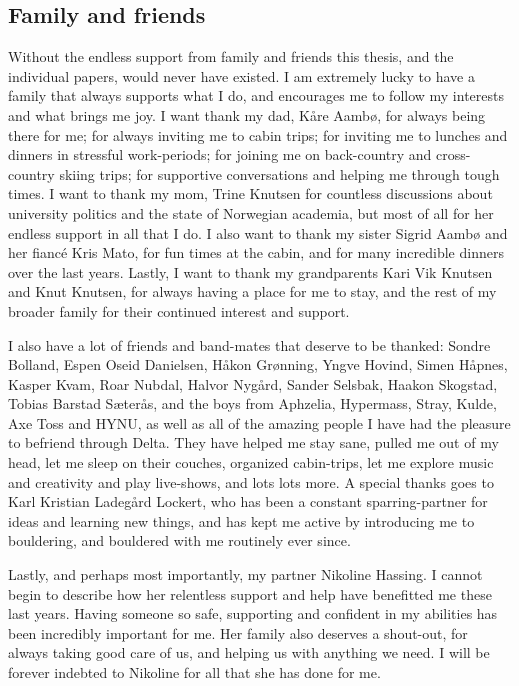 \subsection*{Family and friends}

Without the endless support from family and friends this thesis, and the individual papers, would never have existed. I am extremely lucky to have a family that always supports what I do, and encourages me to follow my interests and what brings me joy. I want thank my dad, Kåre Aambø, for always being there for me; for always inviting me to cabin trips; for inviting me to lunches and dinners in stressful work-periods; for joining me on back-country and cross-country skiing trips; for supportive conversations and helping me through tough times. I want to thank my mom, Trine Knutsen for countless discussions about university politics and the state of Norwegian academia, but most of all for her endless support in all that I do. I also want to thank my sister Sigrid Aambø and her fiancé Kris Mato, for fun times at the cabin, and for many incredible dinners over the last years. Lastly, I want to thank my grandparents Kari Vik Knutsen and Knut Knutsen, for always having a place for me to stay, and the rest of my broader family for their continued interest and support. 

I also have a lot of friends and band-mates that deserve to be thanked: 
Sondre Bolland, 
Espen Oseid Danielsen, 
Håkon Grønning, 
Yngve Hovind, 
Simen Håpnes, 
Kasper Kvam, 
Roar Nubdal, 
Halvor Nygård, 
Sander Selsbak, 
Haakon Skogstad, 
Tobias Barstad Sæterås, 
and the boys from Aphzelia, Hypermass, Stray, Kulde, Axe Toss and HYNU, as well as all of the amazing people I have had the pleasure to befriend through Delta. They have helped me stay sane, pulled me out of my head, let me sleep on their couches, organized cabin-trips, let me explore music and creativity and play live-shows, and lots lots more. A special thanks goes to Karl Kristian Ladegård Lockert, who has been a constant sparring-partner for ideas and learning new things, and has kept me active by introducing me to bouldering, and bouldered with me routinely ever since. 

Lastly, and perhaps most importantly, my partner Nikoline Hassing. I cannot begin to describe how her relentless support and help have benefitted me these last years. Having someone so safe, supporting and confident in my abilities has been incredibly important for me. Her family also deserves a shout-out, for always taking good care of us, and helping us with anything we need. I will be forever indebted to Nikoline for all that she has done for me. 


